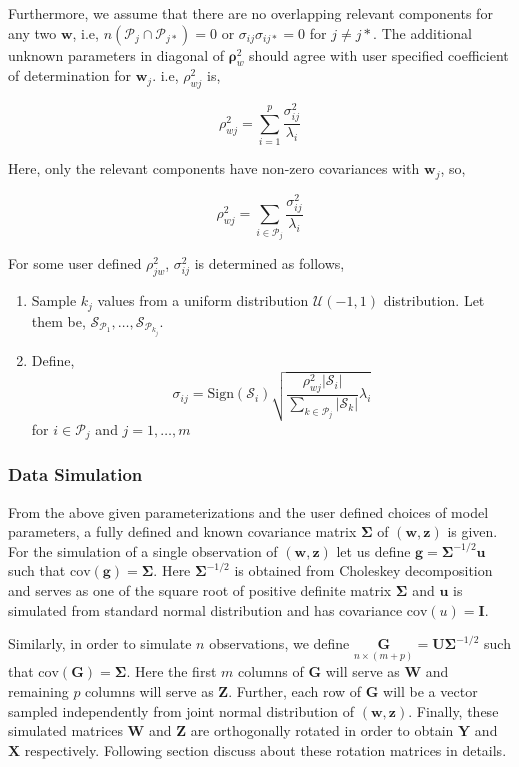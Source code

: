 \documentclass[12pt,A4paper,authoryear]{elsarticle} %
\providecommand{\tightlist}{%
  \setlength{\itemsep}{0pt}\setlength{\parskip}{0pt}}
\theoremstyle{definition}
\theoremstyle{definition}
\theoremstyle{remark}
\begin{document}
Furthermore, we assume that there are no overlapping relevant components
for any two \(\mathbf{w}\), i.e,
\(n\left(\mathcal{P}_j \cap \mathcal{P}_{j*}\right) = 0\) or
\(\sigma_{ij}\sigma_{ij*} = 0\) for \(j\ne j*\). The additional unknown
parameters in diagonal of \(\boldsymbol{\rho}_w^2\) should agree with
user specified coefficient of determination for \(\mathbf{w}_j\). i.e,
\(\rho_{wj}^2\) is,

\[
\rho_{wj}^2 = \sum_{i = 1}^p\frac{\sigma_{ij}^2}{\lambda_i}
\]

Here, only the relevant components have non-zero covariances with
\(\mathbf{w}_j\), so,

\[
\rho_{wj}^2 = \sum_{i \in \mathcal{P}_j}\frac{\sigma_{ij}^2}{\lambda_i}
\]

For some user defined \(\rho_{jw}^2\), \(\sigma_{ij}^2\) is determined
as follows,

\begin{enumerate}
\def\labelenumi{\arabic{enumi}.}
\tightlist
\item
  Sample \(k_j\) values from a uniform distribution
  \(\mathcal{U}(-1, 1)\) distribution. Let them be,
  \(\mathcal{S}_{\mathcal{P}_1}, \ldots, \mathcal{S}_{\mathcal{P}_{k_j}}\).
\item
  Define,
  \[\sigma_{ij} = \text{Sign}\left(\mathcal{S}_i\right)\sqrt{\frac{\rho_{wj}^2\left|\mathcal{S}_i\right|}{\sum_{k\in \mathcal{P}_j}\left|\mathcal{S}_k\right|} \lambda_i}\]
  for \(i \in \mathcal{P}_j\) and \(j = 1, \ldots, m\)
\end{enumerate}

\subsubsection{Data Simulation}\label{data-simulation}

From the above given parameterizations and the user defined choices of
model parameters, a fully defined and known covariance matrix
\(\boldsymbol{\Sigma}\) of \((\mathbf{w, z})\) is given. For the
simulation of a single observation of \((\mathbf{w, z})\) let us define
\(\mathbf{g} = \boldsymbol{\Sigma}^{-1/2}\mathbf{u}\) such that
\(\text{cov}(\mathbf{g}) = \boldsymbol{\Sigma}\). Here
\(\boldsymbol{\Sigma}^{-1/2}\) is obtained from Choleskey decomposition
and serves as one of the square root of positive definite matrix
\(\boldsymbol{\Sigma}\) and \(\mathbf{u}\) is simulated from standard
normal distribution and has covariance \(\text{cov}(u) = \mathbf{I}\).

Similarly, in order to simulate \(n\) observations, we define
\(\underset{n \times (m + p)}{\mathbf{G}} = \mathbf{U}\boldsymbol{\Sigma}^{-1/2}\)
such that \(\text{cov}(\mathbf{G}) = \boldsymbol{\Sigma}\). Here the
first \(m\) columns of \(\mathbf{G}\) will serve as \(\mathbf{W}\) and
remaining \(p\) columns will serve as \(\mathbf{Z}\). Further, each row
of \(\mathbf{G}\) will be a vector sampled independently from joint
normal distribution of \(\left(\mathbf{w}, \mathbf{z}\right)\). Finally,
these simulated matrices \(\mathbf{W}\) and \(\mathbf{Z}\) are
orthogonally rotated in order to obtain \(\mathbf{Y}\) and
\(\mathbf{X}\) respectively. Following section discuss about these
rotation matrices in details.
\end{document}
